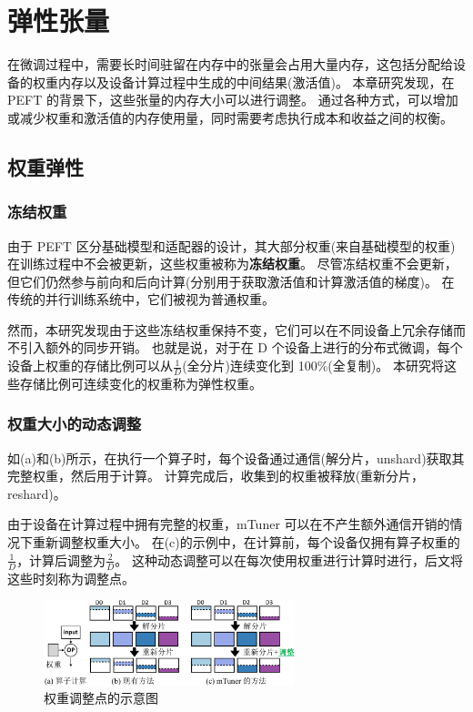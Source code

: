 \section{弹性张量}
\label{mtuner:sec:elastic-tensor}

在微调过程中，需要长时间驻留在内存中的张量会占用大量内存，这包括分配给设备的权重内存以及设备计算过程中生成的中间结果(激活值)。
本章研究发现，在 PEFT 的背景下，这些张量的内存大小可以进行调整。
通过各种方式，可以增加或减少权重和激活值的内存使用量，同时需要考虑执行成本和收益之间的权衡。

\subsection{权重弹性}

\subsubsection{冻结权重}

由于 PEFT 区分基础模型和适配器的设计，其大部分权重(来自基础模型的权重)在训练过程中不会被更新，这些权重被称为\textbf{冻结权重}。
尽管冻结权重不会更新，但它们仍然参与前向和后向计算(分别用于获取激活值和计算激活值的梯度)。
在传统的并行训练系统中，它们被视为普通权重。

然而，本研究发现由于这些冻结权重保持不变，它们可以在不同设备上冗余存储而不引入额外的同步开销。
也就是说，对于在 D 个设备上进行的分布式微调，每个设备上权重的存储比例可以从\(\frac{1}{D}\)(全分片)连续变化到 100\%(全复制)。
本研究将这些存储比例可连续变化的权重称为弹性权重。

\subsubsection{权重大小的动态调整}

如(a)和(b)所示，在执行一个算子时，每个设备通过通信(解分片，unshard)获取其完整权重，然后用于计算。
计算完成后，收集到的权重被释放(重新分片，reshard)。

由于设备在计算过程中拥有完整的权重，mTuner 可以在不产生额外通信开销的情况下重新调整权重大小。
在(c)的示例中，在计算前，每个设备仅拥有算子权重的\(\frac{1}{D}\)，计算后调整为\(\frac{2}{D}\)。
这种动态调整可以在每次使用权重进行计算时进行，后文将这些时刻称为调整点。



\begin{figure}[ht]
\centerline{\includegraphics[width=0.65\textwidth]{figures/mtuner/adjust-point-crop.pdf}}
\caption{权重调整点的示意图}
\label{fig:adjust-point}
\end{figure}


